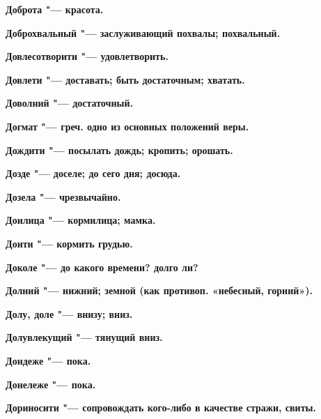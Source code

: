 \begin{multicols}{2}
\bfseries Доброта\normalfont{} "--- красота. 




\bfseries Доброхвальный\normalfont{} "--- заслуживающий похвалы; похвальный. 




\bfseries Довлесотворити\normalfont{} "--- удовлетворить. 




\bfseries Довлети\normalfont{} "--- доставать; быть достаточным; хватать. 




\bfseries Доволний\normalfont{} "--- достаточный. 




\bfseries Догмат\normalfont{} "--- греч. одно из основных положений веры. 




\bfseries Дождити\normalfont{} "--- посылать дождь; кропить; орошать. 




\bfseries Дозде\normalfont{} "--- доселе; до сего дня; досюда. 




\bfseries Дозела\normalfont{} "--- чрезвычайно. 




\bfseries Доилица\normalfont{} "--- кормилица; мамка. 




\bfseries Доити\normalfont{} "--- кормить грудью. 




\bfseries Доколе\normalfont{} "--- до какого времени? долго ли? 




\bfseries Долний\normalfont{} "--- нижний; земной (как противоп. «небесный, горний»). 




\bfseries Долу, доле\normalfont{} "--- внизу; вниз. 




\bfseries Долувлекущий\normalfont{} "--- тянущий вниз. 




\bfseries Дондеже\normalfont{} "--- пока. 




\bfseries Донележе\normalfont{} "--- пока. 




\bfseries Дориносити\normalfont{} "--- сопровождать кого-либо в качестве стражи, свиты. 





\end{multicols}
